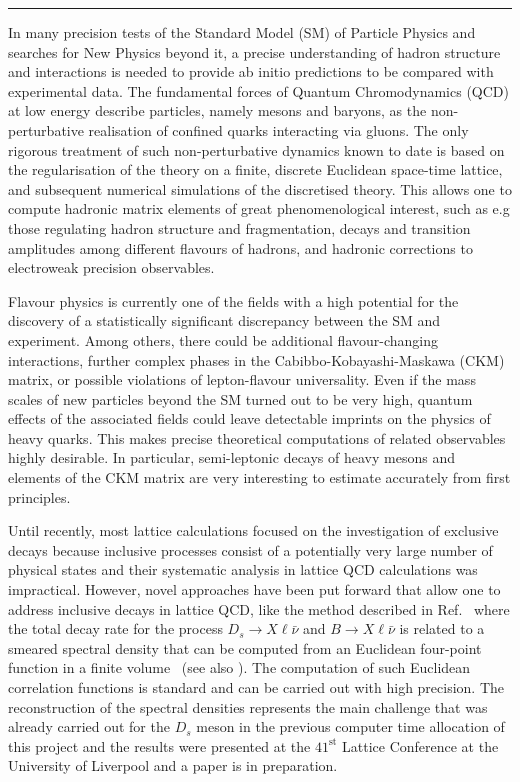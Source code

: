 \rule{\textwidth}{0.4pt}

In many precision tests of the Standard Model (SM) of Particle Physics and
searches for New Physics beyond it, a precise understanding of hadron
structure and interactions is needed to provide ab initio predictions
to be compared with experimental data. The fundamental forces of Quantum
Chromodynamics (QCD) at low energy describe particles, namely mesons and
baryons, as the non-perturbative realisation of confined quarks interacting
via gluons. The only rigorous treatment of such non-perturbative
dynamics known to date is based on the regularisation of the theory on
a finite, discrete Euclidean space-time lattice, and subsequent
numerical simulations of the discretised theory. This allows one to
compute hadronic matrix elements of great phenomenological interest,
such as e.g those regulating hadron structure and fragmentation, decays and transition
amplitudes among different flavours of hadrons, and hadronic corrections
to electroweak precision observables.

Flavour physics is currently one of the fields with a high potential
for the discovery of a statistically significant discrepancy between the SM and
experiment. Among others, there could be additional flavour-changing
interactions, further complex phases in the Cabibbo-Kobayashi-Maskawa (CKM)
matrix, or possible violations
of lepton-flavour universality. Even if the mass scales of new
particles beyond the SM turned out to be very high, quantum effects of
the associated fields could leave detectable imprints on the physics
of heavy quarks.
This makes precise theoretical computations of related observables
highly desirable. In particular, semi-leptonic decays of heavy mesons
and elements of the CKM matrix are very
interesting to estimate accurately from first principles.

Until recently, most lattice calculations focused on the investigation
of exclusive decays because inclusive processes consist
of a potentially very large number of physical states and their
systematic analysis in lattice QCD calculations was impractical.
However, novel approaches have been put forward that allow one to address
inclusive decays in lattice QCD, like the method described in
Ref.~\cite{Gambino:2020crt} where the total decay rate for the process
$D_s \to X\ell\bar\nu$ and $B \to X\ell\bar\nu$   is related to a smeared spectral
density that can be computed from an Euclidean four-point function in a finite
volume~\cite{Hansen:2019idp} (see
also \cite{Bulava:2019kbi,Bulava:2021fre,Gambino:2022dvu}). The computation of such
Euclidean correlation functions is standard and can be carried out
with high precision.
The reconstruction of the spectral densities
represents the main challenge that was already carried out for the $D_s$ meson
in the previous computer time allocation of this project and the results were
presented at the $41^{\mbox{st}}$ Lattice Conference at the University of Liverpool
\cite{talklatt2024_ale, talklatt2024_chr}
and a paper is in preparation.

